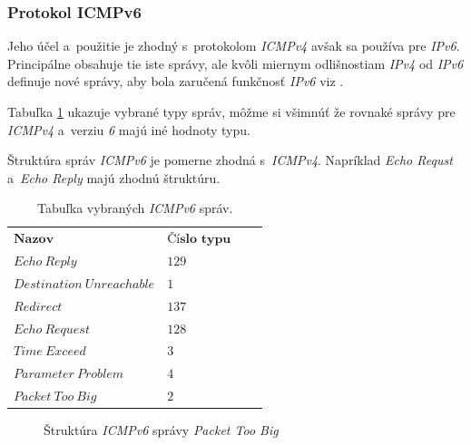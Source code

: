 \documentclass[12pt,a4paper,titlepage]{article}
\begin{document}
    \subsubsection{Protokol ICMPv6}
        Jeho účel a~použitie je zhodný s~protokolom \emph{ICMPv4} avšak sa 
        používa pre \emph{IPv6}. Principálne obsahuje tie iste správy, ale kvôli
        miernym odlišnostiam \emph{IPv4} od \emph{IPv6} definuje nové správy, aby
        bola zaručená funkčnosť \emph{IPv6} viz \cite{rfc_icmpv6}.
    
        Tabuľka \ref{tabulka_icmpv6} ukazuje vybrané typy správ, môžme si všimnúť že 
        rovnaké správy pre \emph{ICMPv4} a~verziu \emph{6} majú iné hodnoty typu.

        Štruktúra správ \emph{ICMPv6} je pomerne zhodná s~\emph{ICMPv4}. Napríklad
        \emph{Echo Requst} a~\emph{Echo Reply} majú zhodnú štruktúru.

        \begin{table}[h!]
            \begin{center}
                \begin{tabular}{llll}
                    $ \textbf{Nazov} $ & $ \textbf{Číslo typu} $ \\ $  Echo\ Reply $ & $ 129 $ \\
                    $  Destination\ Unreachable $ & $ 1 $ \\
                    $  Redirect $ & $ 137 $\\
                    $  Echo\ Request $ & $ 128 $\\
                    $  Time\ Exceed $ & $ 3 $\\
                    $  Parameter\ Problem $ & $ 4 $\\
                    $  Packet\ Too\ Big $ & $ 2 $\\
                \end{tabular}
                \caption{Tabuľka vybraných \emph{ICMPv6} správ.} \label{tabulka_icmpv6}
            \end{center}
        \end{table}

        \begin{figure}[h!]
            \begin{center}
                \caption{Štruktúra \emph{ICMPv6} správy \emph{Packet Too Big}} 
                \label{icmp_packet_too_big}
            \end{center}
        \end{figure}
\end{document}

